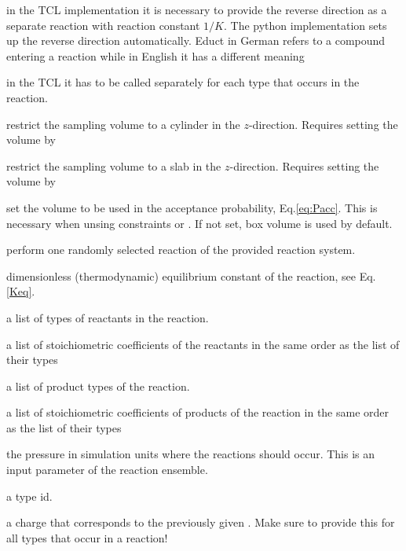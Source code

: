  in the TCL implementation it is necessary to provide the reverse direction as a separate reaction with reaction constant $1/K$. The python implementation sets up the reverse direction automatically. Educt in German refers to a compound entering a reaction while in English
it has a different meaning

 in the TCL it has to be called separately for each type that occurs in the reaction.

 restrict the sampling volume to a cylinder in the $z$-direction. 
Requires setting the volume by 

 restrict the sampling volume to a slab in the $z$-direction.
Requires setting the volume by 

 set the volume to be used in the acceptance probability,
Eq.\ref{eq:Pacc}. This is necessary when unsing constraints  or
. If not set, box volume is used by default.

 perform one randomly selected reaction of the provided reaction system.

  \begin{arguments}
  \item[\var{K}] dimensionless (thermodynamic) equilibrium constant of the reaction, see Eq.\ref{Keq}. 
\item[\var{list\_educt\_types}] a list of types of reactants in the reaction.
\item[\var{list\_educt\_coefficients}] a list of stoichiometric coefficients of the reactants 
	in the same order as the list of their types
\item[\var{list\_product\_types}] a list of product types of the reaction.
\item[\var{list\_product\_coefficients}] a list of stoichiometric coefficients of products of the reaction
	in the same order as the list of their types
\item[\var{desired\_pressure\_at\_which\_reactions\_occur}] the pressure in simulation units where the reactions should occur. This is an input parameter of the reaction ensemble.
\item[\var{type}] a type id.
\item[\var{charge}] a charge that corresponds to the previously given . Make sure to provide this for all types that occur in a reaction!
  \end{arguments}
  

